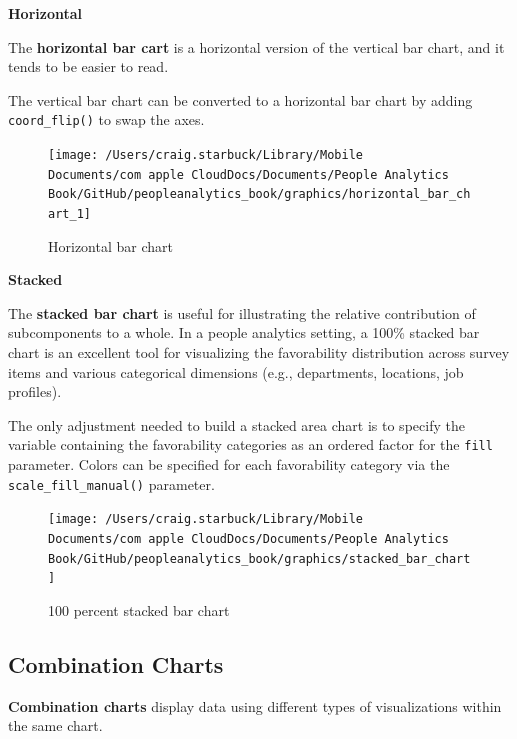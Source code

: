 \documentclass[
]{book}
\begin{document}
\textbf{Horizontal}

The \textbf{horizontal bar cart} is a horizontal version of the vertical bar chart, and it tends to be easier to read.

The vertical bar chart can be converted to a horizontal bar chart by adding \texttt{coord\_flip()} to swap the axes.

\begin{figure}

{\centering \texttt{[image: /Users/craig.starbuck/Library/Mobile Documents/com~apple~CloudDocs/Documents/People Analytics Book/GitHub/peopleanalytics\_book/graphics/horizontal\_bar\_chart\_1]} 

}

\caption{Horizontal bar chart}\label{fig:hbar-chart}
\end{figure}

\textbf{Stacked}

The \textbf{stacked bar chart} is useful for illustrating the relative contribution of subcomponents to a whole. In a people analytics setting, a 100\% stacked bar chart is an excellent tool for visualizing the favorability distribution across survey items and various categorical dimensions (e.g., departments, locations, job profiles).

The only adjustment needed to build a stacked area chart is to specify the variable containing the favorability categories as an ordered factor for the \texttt{fill} parameter. Colors can be specified for each favorability category via the \texttt{scale\_fill\_manual()} parameter.

\begin{figure}

{\centering \texttt{[image: /Users/craig.starbuck/Library/Mobile Documents/com~apple~CloudDocs/Documents/People Analytics Book/GitHub/peopleanalytics\_book/graphics/stacked\_bar\_chart]} 

}

\caption{100 percent stacked bar chart}\label{fig:sbar-chart}
\end{figure}

\hypertarget{combination-charts}{%
\subsection{Combination Charts}\label{combination-charts}}

\textbf{Combination charts} display data using different types of visualizations within the same chart.
\end{document}
